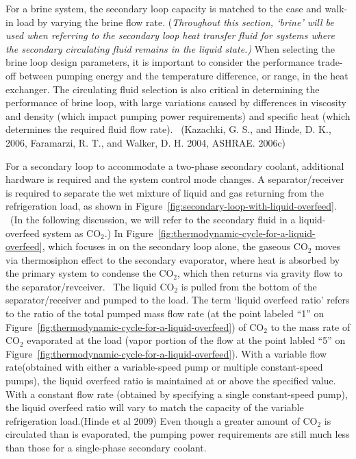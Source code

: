 For a brine system, the secondary loop capacity is matched to the case and walk-in load by varying the brine flow rate. (\emph{Throughout this section, `brine' will be used when referring to the secondary loop heat transfer fluid for systems where the secondary circulating fluid remains in the liquid state.)} When selecting the brine loop design parameters, it is important to consider the performance trade-off between pumping energy and the temperature difference, or range, in the heat exchanger. The circulating fluid selection is also critical in determining the performance of brine loop, with large variations caused by differences in viscosity and density (which impact pumping power requirements) and specific heat (which determines the required fluid flow rate). ~(Kazachki, G. S., and Hinde, D. K., 2006, Faramarzi, R. T., and Walker, D. H. 2004, ASHRAE. 2006c)

For a secondary loop to accommodate a two-phase secondary coolant, additional hardware is required and the system control mode changes. A separator/receiver is required to separate the wet mixture of liquid and gas returning from the refrigeration load, as shown in Figure~\ref{fig:secondary-loop-with-liquid-overfeed}. ~(In the following discussion, we will refer to the secondary fluid in a liquid-overfeed system as CO\(_{2}\).) In Figure~\ref{fig:thermodynamic-cycle-for-a-liquid-overfeed}, which focuses in on the secondary loop alone, the gaseous CO\(_{2}\) moves via thermosiphon effect to the secondary evaporator, where heat is absorbed by the primary system to condense the CO\(_{2}\), which then returns via gravity flow to the separator/revceiver.~ The liquid CO\(_{2}\) is pulled from the bottom of the separator/receiver and pumped to the load. The term `liquid overfeed ratio' refers to the ratio of the total pumped mass flow rate (at the point labeled ``1'' on Figure~\ref{fig:thermodynamic-cycle-for-a-liquid-overfeed}) of CO\(_{2}\) to the mass rate of CO\(_{2}\) evaporated at the load (vapor portion of the flow at the point labled ``5'' on Figure~\ref{fig:thermodynamic-cycle-for-a-liquid-overfeed}). With a variable flow rate(obtained with either a variable-speed pump or multiple constant-speed pumps), the liquid overfeed ratio is maintained at or above the specified value. With a constant flow rate (obtained by specifying a single constant-speed pump), the liquid overfeed ratio will vary to match the capacity of the variable refrigeration load.(Hinde et al 2009) Even though a greater amount of CO\(_{2}\) is circulated than is evaporated, the pumping power requirements are still much less than those for a single-phase secondary coolant.

